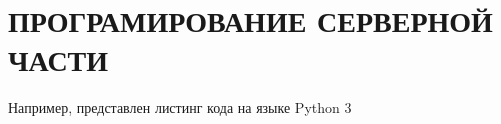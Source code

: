 \chapter{\MakeUppercase{Програмирование серверной части}}
Например, представлен листинг кода на языке Python 3 \\
 \label{list_ref}